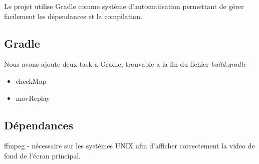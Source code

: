 Le projet utilise Gradle comme système d'automatisation permettant de gérer facilement les dépendances et la compilation.
\subsection{Gradle}
Nous avons ajoute deux task a Gradle, trouvable a la fin du fichier \textit{build.gradle}
\begin{itemize}
    \item checkMap
    \item movReplay
\end{itemize}
\subsection{Dépendances}
ffmpeg - nécessaire sur les systèmes UNIX afin d'afficher correctement la video de fond de l'écran principal.